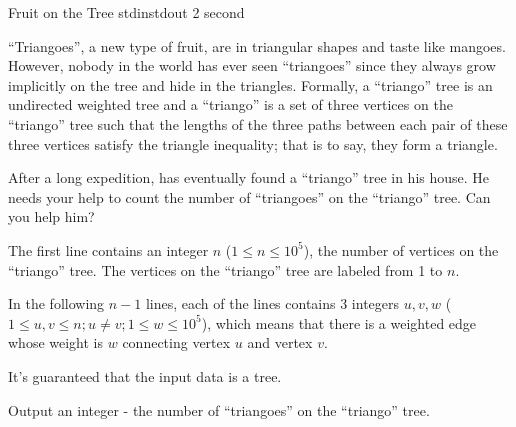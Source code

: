 
\begin{problem}{Fruit on the Tree}
{stdin}{stdout}
{2 second}{}{}

``Triangoes'', a new type of fruit, are in triangular shapes and taste like mangoes. However, nobody in the world has ever seen ``triangoes'' since they always grow implicitly on the tree and hide in the triangles. Formally, a ``triango'' tree is an undirected weighted tree and a ``triango'' is a set of three vertices on the ``triango'' tree such that the lengths of the three paths between each pair of these three vertices satisfy the triangle inequality; that is to say, they form a triangle.

After a long expedition, \Suzukaze has eventually found a ``triango'' tree in his house. He needs your help to count the number of ``triangoes'' on the ``triango'' tree. Can you help him?

\InputFile

The first line contains an integer $n$ ($1 \le n \le 10^5$), the number of vertices on the ``triango'' tree. The vertices on the ``triango'' tree are labeled from 1 to $n$.

In the following $n-1$ lines, each of the lines contains 3 integers $u, v, w$ ($1 \le u,v \le n; u \neq v;1 \le w \le 10^5$), which means that there is a weighted edge whose weight is $w$ connecting vertex $u$ and vertex $v$.

It's guaranteed that the input data is a tree.

\OutputFile

Output an integer - the number of ``triangoes'' on the ``triango'' tree.

\Examples

\begin{example}
%
\end{example}

\end{problem}
